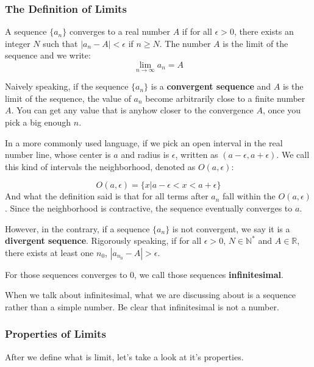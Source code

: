 \documentclass[oneside]{book}
\begin{document}
\subsubsection{The Definition of Limits}

\begin{definition}
A sequence $\{a_n\}$ converges to a real number $A$ if for all $\epsilon > 0$, there exists an integer $N$ such that $|a_n - A|<\epsilon$ if $n\ge N$. The number $A$ is the limit of the sequence and we write:
\[\lim_{n \to \infty} a_n = A\]
\end{definition}
Naively speaking, if the sequence $\{a_n\}$ is a \textbf{convergent sequence} and $A$ is the limit of the sequence, the value of $a_n$ become arbitrarily close to a finite number $A$. You can get any value that is anyhow closer to the convergence $A$, once you pick a big enough $n$.

In a more commonly used language, if we pick an open interval in the real number line, whose center is $a$ and radius is $\epsilon$, written as $(a-\epsilon,a+\epsilon)$. We call this kind of intervals the neighborhood, denoted as $O(a,\epsilon)$:

\[O(a,\epsilon)=\{x|a-\epsilon < x < a+\epsilon\}\]
And what the definition said is that for all terms after $a_n$ fall within the $O(a,\epsilon)$. Since the neighborhood is contractive, the sequence eventually converges to $a$.

However, in the contrary, if a sequence $\{a_n\}$ is not convergent, we say it is a \textbf{divergent sequence}. Rigorously speaking, if for all $\epsilon > 0$, $N \in \mathbb{N}^*$ and $A \in \mathbb{R}$, there exists at least one $n_0$, $|a_{n_0} - A| > \epsilon$.

For those sequences converges to $0$, we call those sequences \textbf{infinitesimal}. 

\begin{remark}
When we talk about infinitesimal, what we are discussing about is a sequence rather than a simple number. Be clear that infinitesimal is not a number.
\end{remark}

\subsubsection{Properties of Limits}

After we define what is limit, let's take a look at it's properties.
\end{document}
